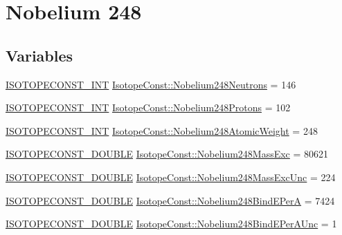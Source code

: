 \hypertarget{group___isotope_const-_nobelium-_no248}{}\section{Nobelium 248}
\label{group___isotope_const-_nobelium-_no248}
\subsection*{Variables}
\begin{DoxyCompactItemize}
\item 
\mbox{\hyperlink{group___isotope_const-_macros_ga5f18360b3e99483a35c32d789e62621c}{I\+S\+O\+T\+O\+P\+E\+C\+O\+N\+S\+T\+\_\+\+I\+NT}} \mbox{\hyperlink{group___isotope_const-_nobelium-_no248_ga4e203faba8161ae12c82ca5a199f0616}{Isotope\+Const\+::\+Nobelium248\+Neutrons}} = 146
\item 
\mbox{\hyperlink{group___isotope_const-_macros_ga5f18360b3e99483a35c32d789e62621c}{I\+S\+O\+T\+O\+P\+E\+C\+O\+N\+S\+T\+\_\+\+I\+NT}} \mbox{\hyperlink{group___isotope_const-_nobelium-_no248_ga7763e02184e82b9408d87f4eaa9a319f}{Isotope\+Const\+::\+Nobelium248\+Protons}} = 102
\item 
\mbox{\hyperlink{group___isotope_const-_macros_ga5f18360b3e99483a35c32d789e62621c}{I\+S\+O\+T\+O\+P\+E\+C\+O\+N\+S\+T\+\_\+\+I\+NT}} \mbox{\hyperlink{group___isotope_const-_nobelium-_no248_gaf434d32b0a303d3e1e0b02b1b6e5ca65}{Isotope\+Const\+::\+Nobelium248\+Atomic\+Weight}} = 248
\item 
\mbox{\hyperlink{group___isotope_const-_macros_ga8f45a7272ce02c0b4c65c44636ed719a}{I\+S\+O\+T\+O\+P\+E\+C\+O\+N\+S\+T\+\_\+\+D\+O\+U\+B\+LE}} \mbox{\hyperlink{group___isotope_const-_nobelium-_no248_ga3e0c8ac09707751b57f30afe95bb0cf0}{Isotope\+Const\+::\+Nobelium248\+Mass\+Exc}} = 80621
\item 
\mbox{\hyperlink{group___isotope_const-_macros_ga8f45a7272ce02c0b4c65c44636ed719a}{I\+S\+O\+T\+O\+P\+E\+C\+O\+N\+S\+T\+\_\+\+D\+O\+U\+B\+LE}} \mbox{\hyperlink{group___isotope_const-_nobelium-_no248_gaf731bc2fd3fb54b0d1ad5e1630527b0b}{Isotope\+Const\+::\+Nobelium248\+Mass\+Exc\+Unc}} = 224
\item 
\mbox{\hyperlink{group___isotope_const-_macros_ga8f45a7272ce02c0b4c65c44636ed719a}{I\+S\+O\+T\+O\+P\+E\+C\+O\+N\+S\+T\+\_\+\+D\+O\+U\+B\+LE}} \mbox{\hyperlink{group___isotope_const-_nobelium-_no248_ga08e5c7e8f6027ddc520299651cbd061a}{Isotope\+Const\+::\+Nobelium248\+Bind\+E\+PerA}} = 7424
\item 
\mbox{\hyperlink{group___isotope_const-_macros_ga8f45a7272ce02c0b4c65c44636ed719a}{I\+S\+O\+T\+O\+P\+E\+C\+O\+N\+S\+T\+\_\+\+D\+O\+U\+B\+LE}} \mbox{\hyperlink{group___isotope_const-_nobelium-_no248_gab64705b25614f24a1da318fc472de96b}{Isotope\+Const\+::\+Nobelium248\+Bind\+E\+Per\+A\+Unc}} = 1

\end{DoxyCompactItemize}

